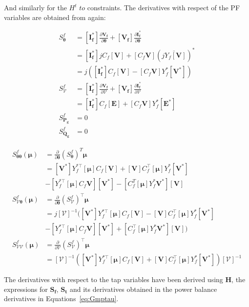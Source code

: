 And similarly for the $H^t$ $to$ constraints. The derivatives with respect of the PF variables are obtained from \cite{zimmermanTN2} again:


\begin{equation}
    \begin{split}
    S_{\bm{\theta}}^f &= \left[ \bm{I_f^*} \right] \frac{\partial \bm{V_f}}{\partial \bm{\theta}} + \left[ \bm{V_f} \right] \frac{\partial \bm{I_f^*}}{\partial \bm{\theta}} \\
    &= \left[ \bm{I_f^*} \right] jC_f [\bm{V}] + [C_f\bm{V}] (\bar{jY_f [\bm{V}]})^* \\
    &= j\left( [\bm{I_f^*}] C_f [\bm{V}] - [C_f \bm{V}]Y_f^* [\bm{V^*}] \right) \\
    S_{\bm{\mathcal{V}}}^f &= \left[ \bm{I_f^*} \right] \frac{\partial \bm{V_f}}{\partial \bm{\mathcal{V}}} + \left[ \bm{V_f} \right] \frac{\partial \bm{I_f^*}}{\partial \bm{\mathcal{V}}} \\
    &= \left[ \bm{I_f^*} \right] C_f [\bm{E}] + [C_f \bm{V}] Y_f^* [\bm{E^*}] \\
    S_{\bm{P_g}}^f &= 0 \\
    S_{\bm{Q_g}}^f &= 0
    \end{split}
\end{equation}

\begin{equation}
    \begin{split}
    S_{\bm{\theta \theta}}^f(\bm{\mu}) &= \frac{\partial}{\partial \bm{\theta}} \left( S_{\bm{\theta}}^f \right)^T \bm{\mu}\\
    &= [\bm{V^*}] Y_f^{*\top} [\bm{\mu}] C_f [\bm{V}] + [\bm{V}] C_f^\top [\bm{\mu}] Y_f^* [\bm{V^*}] \\
    &- [Y_f^{*\top} [\bm{\mu}] C_f \bm{V}] [\bm{V^*}] - [C_f^T [\bm{\mu}] Y_f^* \bm{V^*}] [\bm{V}]\\
    S_{\bm{\mathcal{V} \theta}}^f(\bm{\mu}) &= \frac{\partial}{\partial \bm{\theta}} \left( S_{\bm{\mathcal{V}}}^f \right)^\top \bm{\mu}\\
    &= j [\bm{\mathcal{V}}]^{-1} ( [\bm{\mathbf{V}^*}] Y_f^{*\top} [\bm{\mu}] C_f [\bm{\mathbf{V}}]  - [\bm{\mathbf{V}}] C_f^\top [\bm{\mu}] Y_f^* [\bm{\mathbf{V}^*}] \\
    &-[ Y_f^{*\top} [\bm{\mu}] C_f \bm{\mathbf{V}}] [\bm{\mathbf{V}^*}] + [C_f^\top [\bm{\mu}] Y_f^* \bm{\mathbf{V}^*}] [\bm{\mathbf{V}}]) \\
    S_{\bm{\mathcal{V} \mathcal{V}}}^f(\bm{\mu}) &= \frac{\partial}{\partial \bm{\mathcal{V}}} \left( S_{\bm{\mathcal{V}}}^f \right)^\top \bm{\mu}\\
    &= [\bm{\mathcal{V}}]^{-1} \left( [\bm{\mathbf{V}^*}] Y_f^{*\top} [\bm{\mu}] C_f [\bm{\mathbf{V}}] + [\bm{\mathbf{V}}] C_f^\top [\bm{\mu}] Y_f^* [\bm{\mathbf{V}^*}] \right) [\bm{\mathcal{V}}]^{-1}
    \end{split}
\end{equation}

   
The derivatives with respect to the tap variables have been derived using $\bm{H}$, the expressions for $\bm{S_f}$, $\bm{S_t}$ and its derivatives obtained in the power balance derivatives in Equations~\eqref{eq:Gmptau}.













